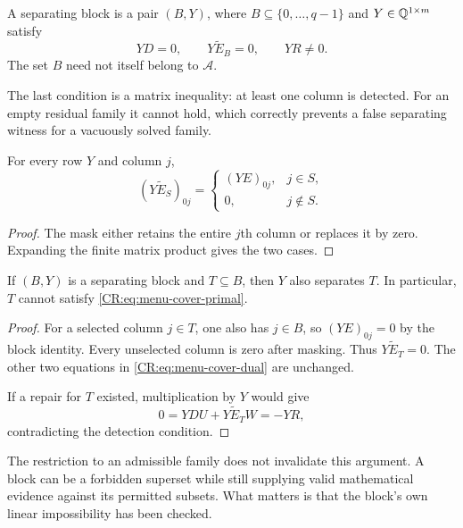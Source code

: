 \begin{CRdefinition}
A separating block is a pair $(B,Y)$, where $B\subseteq\{0,\ldots,q-1\}$ and $Y\in\mathbb{Q}^{1\times m}$ satisfy
\begin{equation}
 YD=0,\qquad Y\widetilde E_B=0,\qquad YR\ne0.
 \label{CR:eq:menu-cover-dual}
\end{equation}
The set $B$ need not itself belong to $\mathcal A$.
\end{CRdefinition}

The last condition is a matrix inequality: at least one column is detected. For an empty residual family it cannot hold, which correctly prevents a false separating witness for a vacuously solved family.

\begin{CRlemma}
For every row $Y$ and column $j$,
\[
 (Y\widetilde E_S)_{0j}=
 \begin{cases}
 (YE)_{0j},&j\in S,\\
 0,&j\notin S.
 \end{cases}
\]
\end{CRlemma}
\begin{proof}
The mask either retains the entire $j$th column or replaces it by zero. Expanding the finite matrix product gives the two cases.
\end{proof}

\begin{CRtheorem}
If $(B,Y)$ is a separating block and $T\subseteq B$, then $Y$ also separates $T$. In particular, $T$ cannot satisfy \eqref{CR:eq:menu-cover-primal}.
\end{CRtheorem}
\begin{proof}
For a selected column $j\in T$, one also has $j\in B$, so $(YE)_{0j}=0$ by the block identity. Every unselected column is zero after masking. Thus $Y\widetilde E_T=0$. The other two equations in \eqref{CR:eq:menu-cover-dual} are unchanged.

If a repair for $T$ existed, multiplication by $Y$ would give
\[
 0=YDU+Y\widetilde E_TW=-YR,
\]
contradicting the detection condition.
\end{proof}

The restriction to an admissible family does not invalidate this argument. A block can be a forbidden superset while still supplying valid mathematical evidence against its permitted subsets. What matters is that the block's own linear impossibility has been checked.

